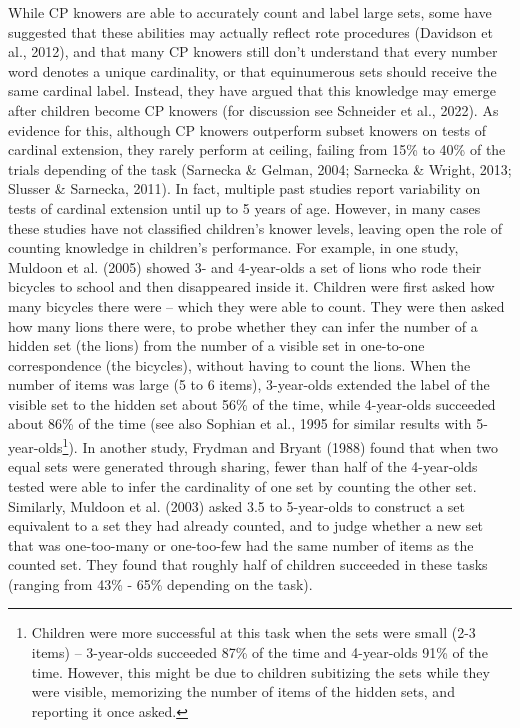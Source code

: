 \documentclass[
  man,floatsintext]{apa7}
\begin{document}
While CP knowers are able to accurately count and label large sets, some have suggested that these abilities may actually reflect rote procedures (Davidson et al., 2012), and that many CP knowers still don't understand that every number word denotes a unique cardinality, or that equinumerous sets should receive the same cardinal label. Instead, they have argued that this knowledge may emerge after children become CP knowers (for discussion see Schneider et al., 2022). As evidence for this, although CP knowers outperform subset knowers on tests of cardinal extension, they rarely perform at ceiling, failing from 15\% to 40\% of the trials depending of the task (Sarnecka \& Gelman, 2004; Sarnecka \& Wright, 2013; Slusser \& Sarnecka, 2011). In fact, multiple past studies report variability on tests of cardinal extension until up to 5 years of age. However, in many cases these studies have not classified children's knower levels, leaving open the role of counting knowledge in children's performance. For example, in one study, Muldoon et al. (2005) showed 3- and 4-year-olds a set of lions who rode their bicycles to school and then disappeared inside it. Children were first asked how many bicycles there were -- which they were able to count. They were then asked how many lions there were, to probe whether they can infer the number of a hidden set (the lions) from the number of a visible set in one-to-one correspondence (the bicycles), without having to count the lions. When the number of items was large (5 to 6 items), 3-year-olds extended the label of the visible set to the hidden set about 56\% of the time, while 4-year-olds succeeded about 86\% of the time (see also Sophian et al., 1995 for similar results with 5-year-olds\footnote{Children were more successful at this task when the sets were small (2-3 items) -- 3-year-olds succeeded 87\% of the time and 4-year-olds 91\% of the time. However, this might be due to children subitizing the sets while they were visible, memorizing the number of items of the hidden sets, and reporting it once asked.}). In another study, Frydman and Bryant (1988) found that when two equal sets were generated through sharing, fewer than half of the 4-year-olds tested were able to infer the cardinality of one set by counting the other set. Similarly, Muldoon et al. (2003) asked 3.5 to 5-year-olds to construct a set equivalent to a set they had already counted, and to judge whether a new set that was one-too-many or one-too-few had the same number of items as the counted set. They found that roughly half of children succeeded in these tasks (ranging from 43\% - 65\% depending on the task).
\end{document}
